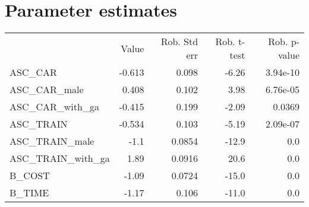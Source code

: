 \section{Parameter estimates}
\begin{tabular}{lrrrr}
 & Value & Rob. Std err & Rob. t-test & Rob. p-value \\
ASC_CAR & -0.613 & 0.098 & -6.26 & 3.94e-10 \\
ASC_CAR_male & 0.408 & 0.102 & 3.98 & 6.76e-05 \\
ASC_CAR_with_ga & -0.415 & 0.199 & -2.09 & 0.0369 \\
ASC_TRAIN & -0.534 & 0.103 & -5.19 & 2.09e-07 \\
ASC_TRAIN_male & -1.1 & 0.0854 & -12.9 & 0.0 \\
ASC_TRAIN_with_ga & 1.89 & 0.0916 & 20.6 & 0.0 \\
B_COST & -1.09 & 0.0724 & -15.0 & 0.0 \\
B_TIME & -1.17 & 0.106 & -11.0 & 0.0 \\
\end{tabular}

